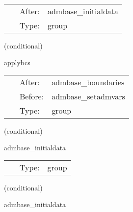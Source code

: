 \documentclass{article}
\begin{document}
\hspace{5mm}

 \begin{tabular*}{160mm}{cll} 
~ & After:  & admbase\_initialdata \\ 
~ & Type:  & group \\ 
\end{tabular*} 


\vspace{5mm}

   (conditional) 

\hspace{5mm} applybcs 

\hspace{5mm}{\it apply the boundary conditions of admbase } 


\hspace{5mm}

 \begin{tabular*}{160mm}{cll} 
~ & After:  & admbase\_boundaries \\ 
~ & Before:  & admbase\_setadmvars \\ 
~ & Type:  & group \\ 
\end{tabular*} 


\vspace{5mm}

   (conditional) 

\hspace{5mm} admbase\_initialdata 

\hspace{5mm}{\it schedule group for calculating adm initial data } 


\hspace{5mm}

 \begin{tabular*}{160mm}{cll} 
~ & Type:  & group \\ 
\end{tabular*} 


\vspace{5mm}

   (conditional) 

\hspace{5mm} admbase\_initialdata 

\hspace{5mm}{\it schedule group for calculating adm initial data } 


\hspace{5mm}
\end{document}
